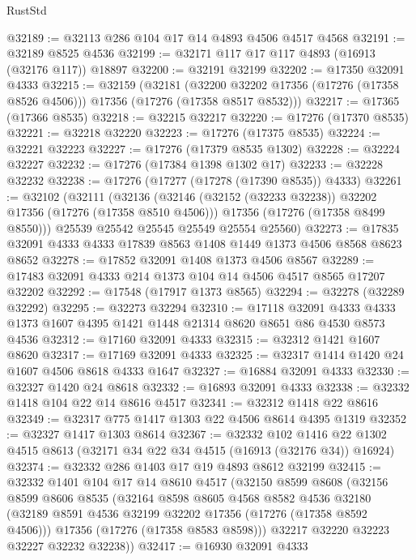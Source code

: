 \begin{lexlean}{RustStd}
\begin{coremodule}
@32189 := @32113 @286 @104 @17 @14 @4893 @4506 @4517 @4568
@32191 := @32189 @8525 @4536
@32199 := @32171 @117 @17 @117 @4893 (@16913 (@32176 @117)) @18897
@32200 := @32191 @32199
@32202 := @17350 @32091 @4333
@32215 := @32159
    (@32181
      (@32200 @32202 @17356 (@17276 (@17358 @8526 @4506)))
      @17356
      (@17276 (@17358 @8517 @8532)))
@32217 := @17365 (@17366 @8535)
@32218 := @32215 @32217
@32220 := @17276 (@17370 @8535)
@32221 := @32218 @32220
@32223 := @17276 (@17375 @8535)
@32224 := @32221 @32223
@32227 := @17276 (@17379 @8535 @1302)
@32228 := @32224 @32227
@32232 := @17276 (@17384 @1398 @1302 @17)
@32233 := @32228 @32232
@32238 := @17276 (@17277 (@17278 (@17390 @8535)) @4333)
@32261 := @32102
    (@32111
      (@32136
        (@32146 (@32152 (@32233 @32238)) @32202 @17356 (@17276 (@17358 @8510 @4506)))
        @17356
        (@17276 (@17358 @8499 @8550)))
      @25539
      @25542
      @25545
      @25549
      @25554
      @25560)
@32273 := @17835 @32091 @4333 @4333 @17839 @8563 @1408 @1449 @1373 @4506 @8568 @8623 @8652
@32278 := @17852 @32091 @1408 @1373 @4506 @8567
@32289 := @17483 @32091 @4333 @214 @1373 @104 @14 @4506 @4517 @8565 @17207 @32202
@32292 := @17548 (@17917 @1373 @8565)
@32294 := @32278 (@32289 @32292)
@32295 := @32273 @32294
@32310 := @17118
    @32091
    @4333
    @4333
    @1373
    @1607
    @4395
    @1421
    @1448
    @21314
    @8620
    @8651
    @86
    @4530
    @8573
    @4536
@32312 := @17160 @32091 @4333
@32315 := @32312 @1421 @1607 @8620
@32317 := @17169 @32091 @4333
@32325 := @32317 @1414 @1420 @24 @1607 @4506 @8618 @4333 @1647
@32327 := @16884 @32091 @4333
@32330 := @32327 @1420 @24 @8618
@32332 := @16893 @32091 @4333
@32338 := @32332 @1418 @104 @22 @14 @8616 @4517
@32341 := @32312 @1418 @22 @8616
@32349 := @32317 @775 @1417 @1303 @22 @4506 @8614 @4395 @1319
@32352 := @32327 @1417 @1303 @8614
@32367 := @32332
    @102
    @1416
    @22
    @1302
    @4515
    @8613
    (@32171 @34 @22 @34 @4515 (@16913 (@32176 @34)) @16924)
@32374 := @32332 @286 @1403 @17 @19 @4893 @8612 @32199
@32415 := @32332
    @1401
    @104
    @17
    @14
    @8610
    @4517
    (@32150
      @8599
      @8608
      (@32156
        @8599
        @8606
        @8535
        (@32164
          @8598
          @8605
          @4568
          @8582
          @4536
          @32180
          (@32189 @8591 @4536 @32199 @32202 @17356 (@17276 (@17358 @8592 @4506)))
          @17356
          (@17276 (@17358 @8583 @8598)))
        @32217
        @32220
        @32223
        @32227
        @32232
        @32238))
@32417 := @16930 @32091 @4333

\end{coremodule}
\end{lexlean}
